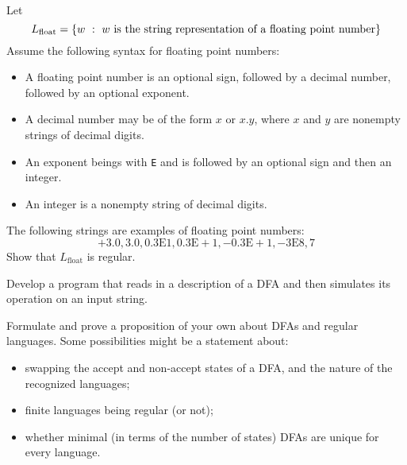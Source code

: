 \documentclass[twoside,letterpaper,openany]{book}
\begin{document}
\begin{exer2}\label{exer:floatingpoint}
~\\Let 
\[L_{\mathrm{float}} = \left\lbrace w\ :\ w~\textrm{is the string representation of a floating point number} \right\rbrace\]
Assume the following syntax for floating point numbers:
\begin{itemize}
\item A floating point number is an optional sign, followed by a decimal number, followed by an optional exponent.
\item A decimal number may be of the form $x$ or $x.y$, where $x$ and $y$ are nonempty strings of decimal digits.
\item An exponent beings with \texttt{E} and is followed by an optional sign and then an integer.
\item An integer is a nonempty string of decimal digits.
\end{itemize}
The following strings are examples of floating point numbers:
\[\mathrm{+3.0, 3.0, 0.3E1, 0.3E+1, -0.3E+1, -3E8, 7}\]
Show that $L_{\mathrm{float}}$ is regular.
\end{exer2}


\begin{progexer}\happymac
Develop a program that reads in a description of a DFA and then simulates its operation on an input string.
\end{progexer}


\begin{stmt}\label{exer:opproprl}
Formulate and prove a proposition of your own about DFAs and regular languages. Some possibilities might be a statement about:
\begin{itemize}
\item swapping the accept and non-accept states of a DFA, and the nature of the recognized languages;
\item finite languages being regular (or not);
\item whether minimal (in terms of the number of states) DFAs are unique for every language.
\end{itemize}
\end{stmt}
\end{document}
